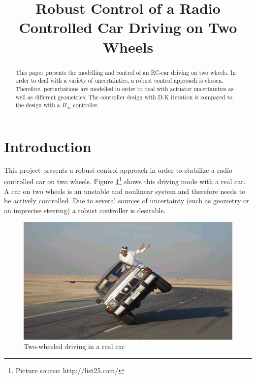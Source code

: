 \documentclass[conference]{IEEEtran}
\begin{document}
\title{Robust Control of a Radio Controlled Car Driving on Two Wheels }


\author{
}

\maketitle

\begin{abstract}

This paper presents the modelling and control of an RC-car driving on two wheels. In order to deal with a variety of uncertainties, a robust control approach is chosen. Therefore, perturbations are modelled in order to deal with actuator uncertainties as well as different geometries. The controller design with D-K iteration is compared to the design with a $H_{\infty}$ controller.

\end{abstract}

\section{Introduction}

This project presents a robust control approach in order to stabilize a radio controlled car on two wheels. Figure \ref{figure:arab_driving}\footnote{Picture source: http://list25.com/} shows this driving mode with a real car. A car on two wheels is an unstable and nonlinear system and therefore needs to be actively controlled. Due to several sources of uncertainty (such as geometry or an imprecise steering) a robust controller is desirable.

\begin{figure}[h]
\centering
  \includegraphics[width=.47\textwidth]{pics/drivesensibly.png} 
  \caption{Two-wheeled driving in a real car}  
  \label{figure:arab_driving}
\end{figure}
\end{document}

